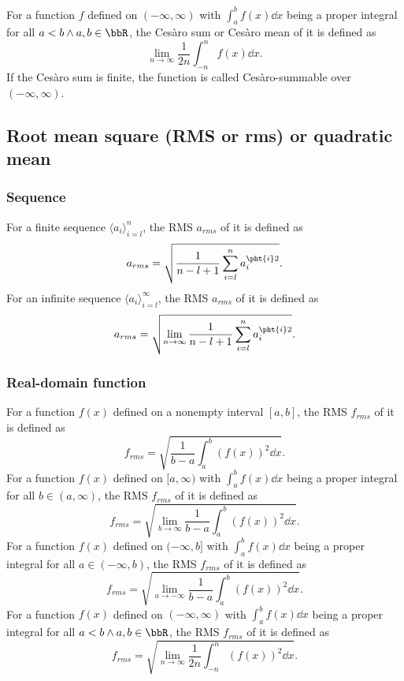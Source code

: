 For a function $f$ defined on $(-\infty,\infty)$ with $\int_a^bf(x)\dd{x}$ being a proper integral for all $a<b\land a,b\in\bbR$, the Cesàro sum or Cesàro mean of it is defined as
\[\lim_{n\to\infty}\frac{1}{2n}\int_{-n}^nf(x)\dd{x}.\]
If the Cesàro sum is finite, the function is called Cesàro-summable over $(-\infty,\infty)$.
\subsection{Root mean square (RMS or rms) or quadratic mean}
\subsubsection{Sequence}
For a finite sequence $\langle a_i\rangle_{i=l}^n$, the RMS $a_{rms}$ of it is defined as
\[a_{rms}=\sqrt{\frac{1}{n-l+1}\sum_{i=l}^na_i^{\pht{i}2}}.\]
For an infinite sequence $\langle a_i\rangle_{i=l}^{\infty}$, the RMS $a_{rms}$ of it is defined as
\[a_{rms}=\sqrt{\lim_{n\to\infty}\frac{1}{n-l+1}\sum_{i=l}^na_i^{\pht{i}2}}.\]
\subsubsection{Real-domain function}
For a function $f(x)$ defined on a nonempty interval $[a,b]$, the RMS $f_{rms}$ of it is defined as
\[f_{rms}=\sqrt{\frac{1}{b-a}\int_a^b(f(x))^2\dd{x}}.\]
For a function $f(x)$ defined on $[a,\infty)$ with $\int_a^bf(x)\dd{x}$ being a proper integral for all $b\in(a,\infty)$, the RMS $f_{rms}$ of it is defined as
\[f_{rms}=\sqrt{\lim_{b\to\infty}\frac{1}{b-a}\int_a^b(f(x))^2\dd{x}}.\]
For a function $f(x)$ defined on $(-\infty,b]$ with $\int_a^bf(x)\dd{x}$ being a proper integral for all $a\in(-\infty,b)$, the RMS $f_{rms}$ of it is defined as
\[f_{rms}=\sqrt{\lim_{a\to-\infty}\frac{1}{b-a}\int_a^b(f(x))^2\dd{x}}.\]
For a function $f(x)$ defined on $(-\infty,\infty)$ with $\int_a^bf(x)\dd{x}$ being a proper integral for all $a<b\land a,b\in\bbR$, the RMS $f_{rms}$ of it is defined as
\[f_{rms}=\sqrt{\lim_{n\to\infty}\frac{1}{2n}\int_{-n}^n(f(x))^2\dd{x}}.\]